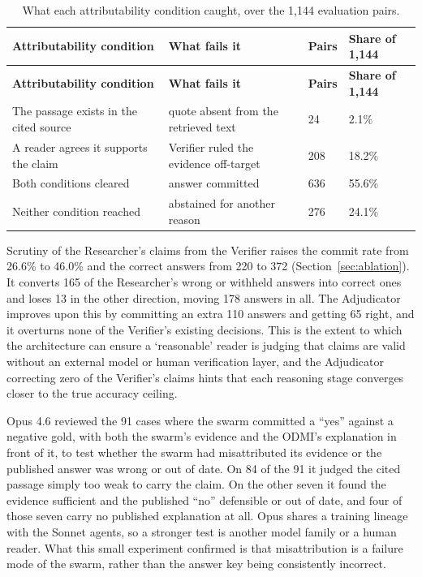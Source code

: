 {\small
\begin{longtable}[]{@{}
  L{0.3750}
  L{0.3409}
  L{0.1136}
  L{0.1705}@{}}
\caption{What each attributability condition caught, over the 1,144 evaluation pairs.}\label{tab:attributability}\\
\toprule\noalign{}
\textbf{Attribut\-ability condition} & \textbf{What fails it} & \textbf{Pairs} & \textbf{Share of 1,144} \\
\midrule\noalign{}
\endfirsthead
\toprule\noalign{}
\textbf{Attribut\-ability condition} & \textbf{What fails it} & \textbf{Pairs} & \textbf{Share of 1,144} \\
\midrule\noalign{}
\endhead
\bottomrule\noalign{}
\endlastfoot
The passage exists in the cited source & quote absent from the retrieved text & 24 & 2.1\% \\
A reader agrees it supports the claim & Verifier ruled the evidence off-target & 208 & 18.2\% \\
Both conditions cleared & answer committed & 636 & 55.6\% \\
Neither condition reached & abstained for another reason & 276 & 24.1\% \\
\end{longtable}
}


Scrutiny of the Researcher's claims from the Verifier raises the commit rate from 26.6\% to 46.0\% and the correct answers from 220 to 372 (Section~\ref{sec:ablation}). It converts 165 of the Researcher's wrong or withheld answers into correct ones and loses 13 in the other direction, moving 178 answers in all. The Adjudicator improves upon this by committing an extra 110 answers and getting 65 right, and it overturns none of the Verifier's existing decisions. This is the extent to which the architecture can ensure a `reasonable' reader is judging that claims are valid without an external model or human verification layer, and the Adjudicator correcting zero of the Verifier's claims hints that each reasoning stage converges closer to the true accuracy ceiling.

Opus 4.6 reviewed the 91 cases where the swarm committed a ``yes'' against a negative gold, with both the swarm's evidence and the ODMI's explanation in front of it, to test whether the swarm had misattributed its evidence or the published answer was wrong or out of date. On 84 of the 91 it judged the cited passage simply too weak to carry the claim. On the other seven it found the evidence sufficient and the published ``no'' defensible or out of date, and four of those seven carry no published explanation at all. Opus shares a training lineage with the Sonnet agents, so a stronger test is another model family or a human reader. What this small experiment confirmed is that misattribution is a failure mode of the swarm, rather than the answer key being consistently incorrect.

